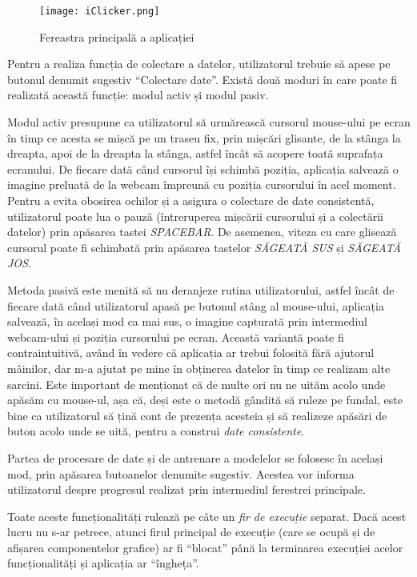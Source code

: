 \begin{figure}[ht]
    \centering
    \texttt{[image: iClicker.png]}
    \caption{Fereastra principală a aplicației}
\end{figure}

Pentru a realiza funcția de colectare a datelor, utilizatorul trebuie să apese pe butonul denumit sugestiv ``Colectare date''.
Există două moduri în care poate fi realizată această funcție: modul activ și modul pasiv.

Modul activ presupune ca utilizatorul să urmărească cursorul mouse-ului pe ecran în timp ce acesta se mișcă pe un traseu fix, prin mișcări glisante, de la stânga la dreapta, apoi de la dreapta la stânga, astfel încât să acopere toată suprafața ecranului.
De fiecare dată când cursorul își schimbă poziția, aplicația salvează o imagine preluată de la webcam împreună cu poziția cursorului în acel moment.
Pentru a evita obosirea ochilor și a asigura o colectare de date consistentă, utilizatorul poate lua o pauză (întreruperea mișcării cursorului și a colectării datelor) prin apăsarea tastei \emph{SPACEBAR}.
De asemenea, viteza cu care glisează cursorul poate fi schimbată prin apăsarea tastelor \emph{SĂGEATĂ SUS} și \emph{SĂGEATĂ JOS}.

Metoda pasivă este menită să nu deranjeze rutina utilizatorului, astfel încât de fiecare dată când utilizatorul apasă pe butonul stâng al mouse-ului, aplicația salvează, în același mod ca mai sus, o imagine capturată prin intermediul webcam-ului și poziția cursorului pe ecran.
Această variantă poate fi contraintuitivă, având în vedere că aplicația ar trebui folosită fără ajutorul mâinilor, dar m-a ajutat pe mine în obținerea datelor în timp ce realizam alte sarcini.
Este important de menționat că de multe ori nu ne uităm acolo unde apăsăm cu mouse-ul, așa că, deși este o metodă gândită să ruleze pe fundal, este bine ca utilizatorul să țină cont de prezența acesteia și să realizeze apăsări de buton acolo unde se uită, pentru a construi \emph{date consistente}.

Partea de procesare de date și de antrenare a modelelor se folosesc în același mod, prin apăsarea butoanelor denumite sugestiv.
Acestea vor informa utilizatorul despre progresul realizat prin intermediul ferestrei principale.

Toate aceste funcționalități rulează pe câte un \emph{fir de execuție} separat.
Dacă acest lucru nu s-ar petrece, atunci firul principal de execuție (care se ocupă și de afișarea componentelor grafice) ar fi ``blocat'' până la terminarea execuției acelor funcționalități și aplicația ar ``îngheța''.

